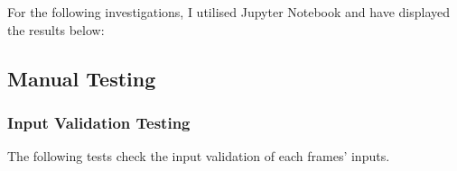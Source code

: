 \documentclass[./project-report/src/latex/project-report.tex]{subfiles}
\begin{document}
For the following investigations, I utilised Jupyter Notebook and have displayed the results below:



\label{sec:train-dataset-size-analysis}




\label{sec:cpu-vs-gpu-analysis}


\subsection{Manual Testing}

\subsubsection{Input Validation Testing} %

The following tests check the input validation of each frames' inputs.
\end{document}
